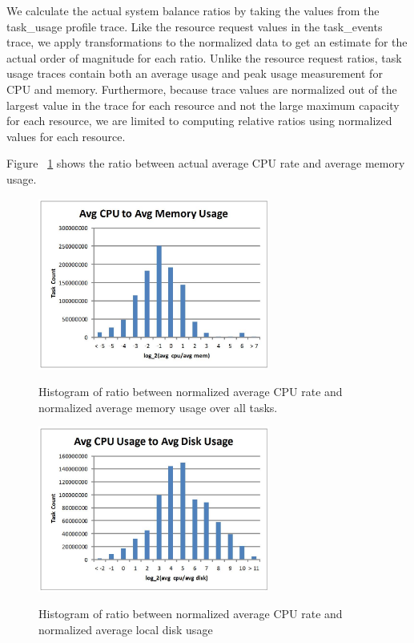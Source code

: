 \documentclass{sig-alternate}
\begin{document}
We calculate the actual system balance ratios by taking the values from the task\_usage profile trace.
Like the resource request values in the task\_events trace, we apply transformations to the normalized data to get an estimate for the actual order of magnitude for each ratio.
Unlike the resource request ratios, task usage traces contain both an average usage and peak usage measurement for CPU and memory.
Furthermore, because trace values are normalized out of the largest value in the trace for each resource and not the large maximum capacity for each resource, we are limited to computing relative ratios using normalized values for each resource.

Figure ~\ref{avg_act_cpu_mem} shows the ratio between actual average CPU rate and average memory usage.


\begin{figure}
\centering
\includegraphics[width=3in]{../figures/avg_act_cpu_mem.jpg}
\label{avg_act_cpu_mem}
\caption{Histogram of ratio between normalized average CPU rate and normalized average memory usage over all tasks.}
\end{figure}

\begin{figure}
\centering
\includegraphics[width=3in]{../figures/avg_act_cpu_disk.jpg}
\label{avg_act_cpu_disk}
\caption{Histogram of ratio between normalized average CPU rate and normalized average local disk usage}
\end{figure}
\end{document}
